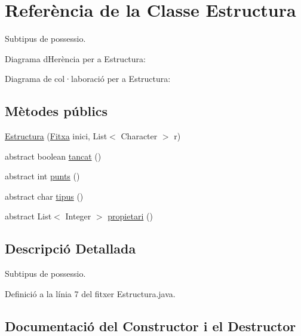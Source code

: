 \hypertarget{class_estructura}{}\section{Referència de la Classe Estructura}
\label{class_estructura}


Subtipus de possessio.  




Diagrama d\textquotesingle{}Herència per a Estructura\+:


Diagrama de col·laboració per a Estructura\+:
\subsection*{Mètodes públics}
\begin{DoxyCompactItemize}
\item 
\mbox{\hyperlink{class_estructura_a64ce3d7d140d77f8343beb345dea6d03}{Estructura}} (\mbox{\hyperlink{class_fitxa}{Fitxa}} inici, List$<$ Character $>$ r)
\item 
abstract boolean \mbox{\hyperlink{class_estructura_a14634d639179cbff04fefe8f4ff9d46a}{tancat}} ()
\item 
abstract int \mbox{\hyperlink{class_estructura_a0cfa7e48f733d9dd7852a188b8be9c3c}{punts}} ()
\item 
abstract char \mbox{\hyperlink{class_estructura_a12bf84c0b65ccd29a08bbd8e82252698}{tipus}} ()
\item 
abstract List$<$ Integer $>$ \mbox{\hyperlink{class_estructura_a5b6bda815f1395bcec964582050a13b8}{propietari}} ()
\end{DoxyCompactItemize}


\subsection{Descripció Detallada}
Subtipus de possessio. 

Definició a la línia 7 del fitxer Estructura.\+java.



\subsection{Documentació del Constructor i el Destructor}
\mbox{\label{class_estructura_a64ce3d7d140d77f8343beb345dea6d03}} 
